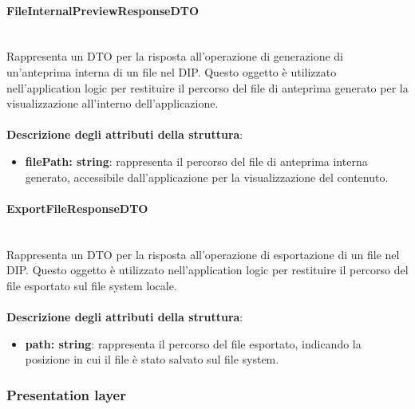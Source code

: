 \documentclass[a4paper,12pt]{article}
\begin{document}
{{{                \paragraph{FileInternalPreviewResponseDTO}\label{par:FileInternalPreviewResponseDTO}\mbox{}\\
                Rappresenta un DTO per la risposta all'operazione di generazione di un'anteprima interna di un file nel DIP. Questo oggetto è utilizzato nell'application logic per restituire il percorso del file di anteprima generato per la visualizzazione all'interno dell'applicazione.\\
                \\
                \textbf{Descrizione degli attributi della struttura}:
                \begin{itemize}
                    \item \textbf{filePath: string}: rappresenta il percorso del file di anteprima interna generato, accessibile dall'applicazione per la visualizzazione del contenuto.
                \end{itemize}
                \paragraph{ExportFileResponseDTO}\label{par:ExportFileResponseDTO}\mbox{}\\
                Rappresenta un DTO per la risposta all'operazione di esportazione di un file nel DIP. Questo oggetto è utilizzato nell'application logic per restituire il percorso del file esportato sul file system locale.\\
                \\
                \textbf{Descrizione degli attributi della struttura}:
                \begin{itemize}
                    \item \textbf{path: string}: rappresenta il percorso del file esportato, indicando la posizione in cui il file è stato salvato sul file system.
                \end{itemize}
            }
            
            \subsubsection{Presentation layer} {
}}}
\end{document}
